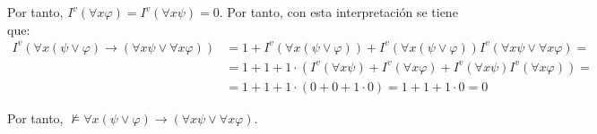 \begin{ejercicio}
    Por tanto, $I^v(\forall x \varphi)=I^v(\forall x \psi)=0$. Por tanto, con esta interpretación se tiene que:
    \begin{align*}
        I^v\left(\forall x(\psi \vee \varphi) \rightarrow (\forall x \psi \vee \forall x \varphi)\right)
        &= 1+I^v(\forall x(\psi \vee \varphi))+I^v(\forall x(\psi \vee \varphi))I^v(\forall x \psi \vee \forall x \varphi) =\\&= 1+1+1\cdot \left(I^v(\forall x \psi) + I^v(\forall x \varphi) + I^v(\forall x \psi)I^v(\forall x \varphi)\right) =\\&= 1+1+1\cdot(0+0+1\cdot 0) = 1+1+1\cdot 0 = 0
    \end{align*}

    Por tanto, $\not\models \forall x(\psi \vee \varphi) \rightarrow (\forall x \psi \vee \forall x \varphi)$.
\end{ejercicio}

